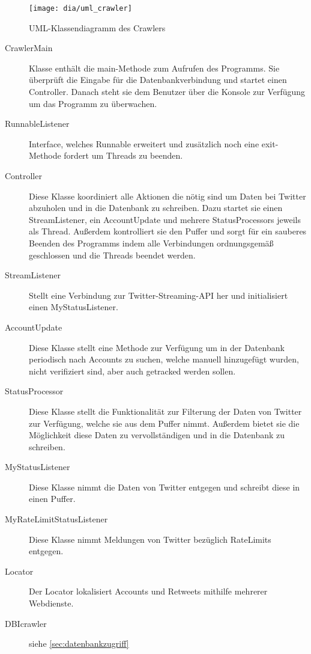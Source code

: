 \begin{figure}[h!]
	\centering
	\texttt{[image: dia/uml\_crawler]}
	\caption{UML-Klassendiagramm des Crawlers}
	\label{fig:uml_crawler}
\end{figure}

\begin{description}
\item[CrawlerMain] Klasse enthält die main-Methode zum Aufrufen des Programms. Sie überprüft die Eingabe für die Datenbankverbindung und startet einen Controller. Danach steht sie dem Benutzer über die Konsole zur Verfügung um das Programm zu überwachen.
\item[RunnableListener] Interface, welches Runnable erweitert und zusätzlich noch eine exit-Methode fordert um Threads zu beenden.
\item[Controller] Diese Klasse koordiniert alle Aktionen die nötig sind um Daten bei Twitter abzuholen und in die Datenbank zu schreiben. Dazu startet sie einen StreamListener, ein AccountUpdate und mehrere StatusProcessors jeweils als Thread. Außerdem kontrolliert sie den Puffer und sorgt für ein sauberes Beenden des Programms indem alle Verbindungen ordnungsgemäß geschlossen und die Threads beendet werden.
\item[StreamListener] Stellt eine Verbindung zur Twitter-Streaming-API her und initialisiert einen MyStatusListener.
\item[AccountUpdate] Diese Klasse stellt eine Methode zur Verfügung um in der Datenbank periodisch nach Accounts zu suchen, welche manuell hinzugefügt wurden, nicht verifiziert sind, aber auch getracked werden sollen.
\item[StatusProcessor] Diese Klasse stellt die Funktionalität zur Filterung der Daten von Twitter zur Verfügung, welche sie aus dem Puffer nimmt. Außerdem bietet sie die Möglichkeit diese Daten zu vervollständigen und in die Datenbank zu schreiben.
\item[MyStatusListener] Diese Klasse nimmt die Daten von Twitter entgegen und schreibt diese in einen Puffer.
\item[MyRateLimitStatusListener] Diese Klasse nimmt Meldungen von Twitter bezüglich RateLimits entgegen.
\item[Locator] Der Locator lokalisiert Accounts und Retweets mithilfe mehrerer Webdienste.
\item[DBIcrawler] siehe \cref{sec:datenbankzugriff}
\end{description}

